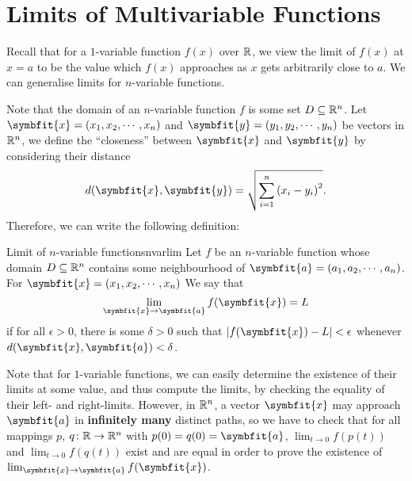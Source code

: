 \documentclass[math]{amznotes}
\theoremstyle{remark}
\begin{document}
\section{Limits of Multivariable Functions}
Recall that for a $1$-variable function $f(x)$ over $\mathbb{R}$, we view the limit of $f(x)$ at $x = a$ to be the value which $f(x)$ approaches as $x$ gets arbitrarily close to $a$. We can generalise limits for $n$-variable functions.

Note that the domain of an $n$-variable function $f$ is some set $D \subseteq \mathbb{R}^n$. Let $\symbfit{x} = \left(x_1, x_2, \cdots, x_n\right)$ and $\symbfit{y} = \left(y_1, y_2, \cdots, y_n\right)$ be vectors in $\mathbb{R}^n$, we define the ``closeness'' between $\symbfit{x}$ and $\symbfit{y}$ by considering their distance
\begin{equation*}
    d(\symbfit{x}, \symbfit{y}) = \sqrt{\sum_{i = 1}^n \left(x_i - y_i\right)^2}.
\end{equation*}
Therefore, we can write the following definition:
\begin{dfnbox}{Limit of $n$-variable functions}{nvarlim}
    Let $f$ be an $n$-variable function whose domain $D \subseteq \mathbb{R}^n$ contains some neighbourhood of $\symbfit{a} = \left(a_1, a_2, \cdots, a_n\right)$. For $\symbfit{x} = \left(x_1, x_2, \cdots, x_n\right)$ We say that
    \begin{equation*}
        \lim_{\symbfit{x} \to \symbfit{a}} f(\symbfit{x}) = L
    \end{equation*}
    if for all $\epsilon > 0$, there is some $\delta > 0$ such that $\left|f(\symbfit{x}) - L\right| < \epsilon$ whenever $d(\symbfit{x}, \symbfit{a}) < \delta$.
\end{dfnbox}
Note that for $1$-variable functions, we can easily determine the existence of their limits at some value, and thus compute the limits, by checking the equality of their left- and right-limits. However, in $\mathbb{R}^n$, a vector $\symbfit{x}$ may approach $\symbfit{a}$ in {\color{red} \textbf{infinitely many}} distinct paths, so we have to check that for all mappings $p$, $q \colon \mathbb{R} \to \mathbb{R}^n$ with $p(0) = q(0) = \symbfit{a}$, $\lim_{t \to 0}f(p(t))$ and $\lim_{t \to 0}f(q(t))$ exist and are equal in order to prove the existence of $\lim_{\symbfit{x} \to \symbfit{a}} f(\symbfit{x})$.
\end{document}
